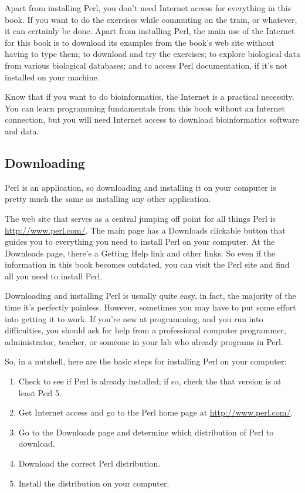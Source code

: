 Apart from installing Perl, you don't need Internet access for everything in this book. If you want to do the exercises while commuting on the train, or whatever, it can certainly be done. Apart from installing Perl, the main use of the Internet for this book is to download its examples from the book's web site without having to type them; to download and try the exercises; to explore biological data from various biological databases; and to access Perl documentation, if it's not installed on your machine.

Know that if you want to do bioinformatics, the Internet is a practical necessity. You can learn programming fundamentals from this book without an Internet connection, but you will need Internet access to download bioinformatics software and data.

\subsection{Downloading}
Perl is an application, so downloading and installing it on your computer is pretty much the same as installing any other application.

The web site that serves as a central jumping off point for all things Perl is \href{http://www.perl.com/}{http://www.perl.com/}. The main page has a Downloads clickable button that guides you to everything you need to install Perl on your computer. At the Downloads page, there's a Getting Help link and other links. So even if the information in this book becomes outdated, you can visit the Perl site and find all you need to install Perl.

Downloading and installing Perl is usually quite easy, in fact, the majority of the time it's perfectly painless. However, sometimes you may have to put some effort into getting it to work. If you're new at programming, and you run into difficulties, you should ask for help from a professional computer programmer, administrator, teacher, or someone in your lab who already programs in Perl.

So, in a nutshell, here are the basic steps for installing Perl on your computer:

\begin{enumerate}
  \item Check to see if Perl is already installed; if so, check the that version is at least Perl 5.
  \item Get Internet access and go to the Perl home page at \href{http://www.perl.com/}{http://www.perl.com/}.
  \item Go to the Downloads page and determine which distribution of Perl to download.
  \item Download the correct Perl distribution.
  \item Install the distribution on your computer.
\end{enumerate}

